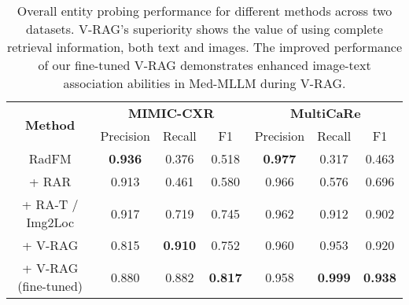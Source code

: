 \begin{table*}[]
\begin{center}

\begin{tabular}{ccccccc}
\hline
\multicolumn{1}{c}{\multirow{2}{*}{\textbf{Method}}} & \multicolumn{3}{c}{\textbf{MIMIC-CXR}}  & \multicolumn{3}{c}{\textbf{MultiCaRe}} \\
\cline{2-7} 
\multicolumn{1}{c}{} & Precision & Recall & F1 & Precision &   Recall & F1 \\ \hline
RadFM &  \textbf{0.936}     &   0.376    &  0.518    & \textbf{0.977}       &   0.317    &   0.463   \\ \hline
+ RAR &   0.913    &  0.461     & 0.580	     & 0.966 & 0.576 &	0.696 \\ 
+ RA-T / Img2Loc&  0.917 &	0.719	& 0.745  & 0.962 &	0.912	& 0.902   \\ \hline
 + V-RAG  &    0.815 &	\textbf{0.910} &	{0.752} &      0.960 &	{0.953} &	{0.920} \\
+ V-RAG (fine-tuned)  &    0.880 &	{0.882} &	\textbf{0.817} &      0.958 &	\textbf{0.999} &	\textbf{0.938} \\ \hline

\end{tabular}
\caption{Overall entity probing performance for different methods across two datasets. V-RAG's superiority shows the value of using complete retrieval information, both text and images. The improved performance of our fine-tuned V-RAG demonstrates enhanced image-text association abilities in Med-MLLM during V-RAG.}
\label{tb:overall}
\end{center}
\end{table*}